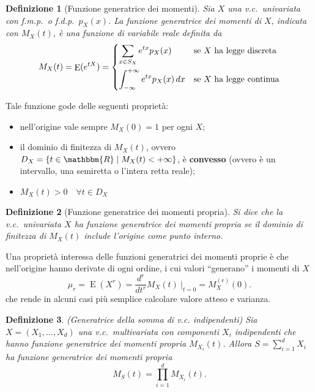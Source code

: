\documentclass[11pt,a4paper,twoside]{article}
\newtheorem{definition}{Definizione}
\newcommand\R{\mathbbm{R}}
\newcommand\dx{\,dx}
\newcommand\computedat{\:\bigg\rvert}
\DeclareMathOperator{\E}{E}
\begin{document}
\begin{definition}[Funzione generatrice dei momenti]
  Sia \(X\) una v.c.\ univariata con f.m.p.\ o f.d.p.\ \(p_X(x)\).  La
  funzione generatrice dei momenti di \(X\), indicata con \(M_X(t)\),
  è una funzione di variabile reale definita da
  \[
    M_X(t) = \E(e^{tX}) = \begin{dcases}
      \sum_{x\in S_X} e^{tx} p_X(x) &\mbox{se \(X\) ha legge discreta} \\
      \int_{-\infty}^{+\infty} e^{tx} p_X(x) \dx &\mbox{se \(X\) ha
        legge continua}
    \end{dcases}
  \]
\end{definition}

Tale funzione gode delle seguenti proprietà:
\begin{itemize}
\item nell'origine vale sempre \(M_X(0) = 1\) per ogni \(X\);
\item il dominio di finitezza di \(M_X(t)\), ovvero \(D_X = \{ t\in\R
  \mid M_X(t) < +\infty \}\), è \textbf{convesso} (ovvero è un
  intervallo, una semiretta o l'intera retta reale);
\item \(M_X(t) > 0 \quad\forall t\in D_X\)
\end{itemize}

\begin{definition}[Funzione generatrice dei momenti propria]
  Si dice che la v.c.\ univariata \(X\) ha funzione generatrice dei
  momenti propria se il dominio di finitezza di \(M_X(t)\) include
  l'origine come punto interno.
\end{definition}

Una proprietà interessa delle funzioni generatrici dei momenti proprie
è che nell'origine hanno derivate di ogni ordine, i cui valori
``generano'' i momenti di \(X\)
\[
  \mu_r = \E(X^r) = \frac{d^r}{dt^r} M_X(t) \computedat_{t = 0} = M_X^{(r)}(0).
\]
che rende in alcuni casi più semplice calcolare valore atteso e varianza.

\begin{definition}(Generatrice della somma di v.c. indipendenti) Sia
  \(X = (X_1, \dots, X_d)\) una v.c.\ multivariata con componenti
  \(X_i\) indipendenti che hanno funzione generatrice dei momenti
  propria \(M_{X_i}(t)\).  Allora \(S = \sum_{i=1}^d X_i\) ha funzione
  generatrice dei momenti propria
  \[
    M_S(t) = \prod_{i=1}^d M_{X_i}(t).
  \]
\end{definition}
\end{document}
